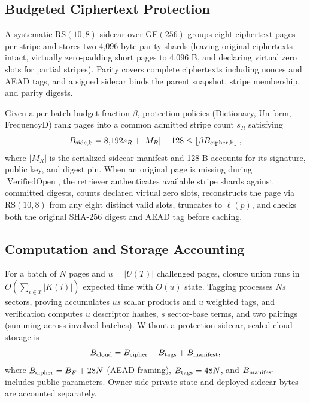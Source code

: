 \documentclass[10pt,journal]{IEEEtran}
\begin{document}
\subsection{Budgeted Ciphertext Protection}\label{sec:protection}
A systematic RS$(10,8)$ sidecar over GF$(256)$ groups eight ciphertext pages per stripe and stores two 4,096-byte parity shards (leaving original ciphertexts intact, virtually zero-padding short pages to 4,096 B, and declaring virtual zero slots for partial stripes). Parity covers complete ciphertexts including nonces and AEAD tags, and a signed sidecar binds the parent snapshot, stripe membership, and parity digests.

Given a per-batch budget fraction $\beta$, protection policies (Dictionary, Uniform, FrequencyD) rank pages into a common admitted stripe count $s_R$ satisfying
\begin{equation}\label{eq:budget}
B_{\rm side,b}=8{,}192s_R+|M_R|+128\leq\left\lfloor\beta B_{\rm cipher,b}\right\rfloor,
\end{equation}
where $|M_R|$ is the serialized sidecar manifest and 128 B accounts for its signature, public key, and digest pin. When an original page is missing during $\operatorname{VerifiedOpen}$, the retriever authenticates available stripe shards against committed digests, counts declared virtual zero slots, reconstructs the page via RS$(10,8)$ from any eight distinct valid slots, truncates to $\ell(p)$, and checks both the original SHA-256 digest and AEAD tag before caching.

\subsection{Computation and Storage Accounting}\label{sec:accounting}
For a batch of $N$ pages and $u=|U(T)|$ challenged pages, closure union runs in $O(\sum_{i\in T}|K(i)|)$ expected time with $O(u)$ state. Tagging processes $Ns$ sectors, proving accumulates $us$ scalar products and $u$ weighted tags, and verification computes $u$ descriptor hashes, $s$ sector-base terms, and two pairings (summing across involved batches). Without a protection sidecar, sealed cloud storage is
\begin{equation}\label{eq:cloud-cost}
B_{\rm cloud}=B_{\rm cipher}+B_{\rm tags}+B_{\rm manifest},
\end{equation}
where $B_{\rm cipher}=B_F+28N$ (AEAD framing), $B_{\rm tags}=48N$, and $B_{\rm manifest}$ includes public parameters. Owner-side private state and deployed sidecar bytes are accounted separately.
\end{document}
